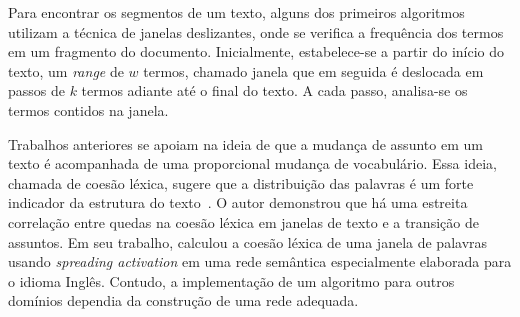 











Para encontrar os segmentos de um texto, alguns dos primeiros algoritmos utilizam a técnica de janelas deslizantes, onde se verifica a frequência dos termos em um fragmento do documento. Inicialmente, estabelece-se a partir do início do texto, um \textit{range} de $w$ termos, chamado janela que em seguida é deslocada em passos de $k$ termos adiante até o final do texto. A cada passo, analisa-se os termos contidos na janela.


Trabalhos anteriores se apoiam na ideia de que a mudança de assunto em um texto é acompanhada de uma proporcional mudança de vocabulário. Essa ideia, chamada de coesão léxica, sugere que a distribuição das palavras é um forte indicador da estrutura do texto~\cite{Kozima1993}. O autor demonstrou que há uma estreita correlação entre quedas na coesão léxica em janelas de texto e a transição de assuntos. Em seu trabalho, calculou a coesão léxica de uma janela de palavras usando \textit{spreading activation} em uma rede semântica especialmente elaborada para o idioma Inglês. Contudo, a implementação de um algoritmo para outros domínios dependia da construção de uma rede adequada. 
















